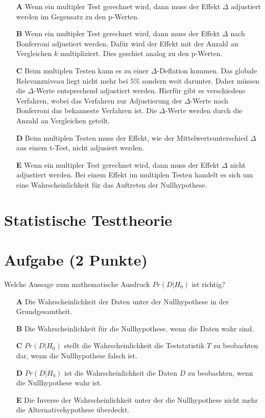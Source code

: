 \documentclass[a4paper, 9pt]{scrartcl}\usepackage[]{graphicx}\usepackage[]{xcolor}
\begin{document}
\begin{enumerate}
\item [\textbf{A} \msquare] Wenn ein multipler Test gerechnet wird, dann muss der Effekt $\Delta$ adjustiert werden im Gegensatz zu den p-Werten.
\item [\textbf{B} \msquare] Wenn ein multipler Test gerechnet wird, dann muss der Effekt $\Delta$ nach Bonferroni adjustiert werden. Dafür wird der Effekt mit der Anzahl an Vergleichen $k$ multipliziert. Dies geschiet analog zu den p-Werten.
\item [\textbf{C} \msquare] Beim multiplen Testen kann es zu einer $\Delta$-Deflation kommen. Das globale Relevanzniveau liegt nicht mehr bei $5\%$ sondern weit darunter. Daher müssen die $\Delta$-Werte entsprechend adjustiert werden. Hierfür gibt es verschiedene Verfahren, wobei das Verfahren zur Adjustierung der $\Delta$-Werte nach Bonferroni das bekanneste Verfahren ist. Die $\Delta$-Werte werden durch die Anzahl an Vergleichen geteilt.
\item [\textbf{D} \msquare] Beim multiplen Testen muss der Effekt, wie der Mittelwertsunterschied $\Delta$ aus einem t-Test, nicht adjusiert werden.
\item [\textbf{E} \msquare] Wenn ein multipler Test gerechnet wird, dann muss der Effekt $\Delta$ nicht adjustiert werden. Bei einem Effekt im multiplen Testen handelt es sich um eine Wahrscheinlichkeit für das Auftreten der Nullhypothese.
\end{enumerate}
\section*{Statistische Testtheorie}  

\section{Aufgabe \hfill (2 Punkte)}




Welche Aussage zum mathematische Ausdruck $Pr(D|H_0)$ ist richtig?



\begin{enumerate}
\item [\textbf{A} \msquare] Die Wahrscheinlichkeit der Daten unter der Nullhypothese in der Grundgesamtheit.
\item [\textbf{B} \msquare] Die Wahrscheinlichkeit für die Nullhypothese, wenn die Daten wahr sind.
\item [\textbf{C} \msquare] $Pr(D|H_0)$ stellt die Wahrscheinlichkeit die Teststatistik $T$ zu beobachten dar, wenn die Nullhypothese falsch ist.
\item [\textbf{D} \msquare] $Pr(D|H_0)$ ist die Wahrscheinlichkeit die Daten $D$ zu beobachten, wenn die Nullhypothese wahr ist.
\item [\textbf{E} \msquare] Die Inverse der Wahrscheinlichkeit unter der die Nullhypothese nicht mehr die Alternativehypothese überdeckt.
\end{enumerate}
\end{document}
